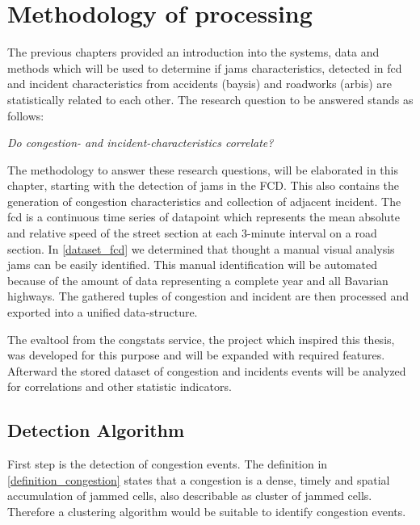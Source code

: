 \chapter{Methodology of processing}
\label{methodology}
The previous chapters provided an introduction into the systems, data and methods which will be used to determine if jams characteristics, detected in \acrshort{fcd} and incident characteristics from accidents (\acrshort{baysis}) and roadworks (\acrshort{arbis}) are statistically related to each other. The research question to be answered stands as follows:

\begin{center}
	\textit{Do congestion- and incident-characteristics correlate?}
\end{center}

\medskip

The methodology to answer these research questions, will be elaborated in this chapter, starting with the detection of jams in the FCD. This also contains the generation of congestion characteristics and collection of adjacent incident. The \acrshort{fcd} is a continuous time series of datapoint which represents the mean absolute and relative speed of the street section at each 3-minute interval on a road section. In \ref{dataset_fcd} we determined that thought a manual visual analysis jams can be easily identified. This manual identification will be automated because of the amount of data representing a complete year and all Bavarian highways. The gathered tuples of congestion and incident are then processed and exported into a unified data-structure. 

The \gls{evaltool} from the \gls{congstats} service, the project which inspired this thesis, was developed for this purpose and will be expanded with required features. Afterward the stored dataset of congestion and incidents events will be analyzed for correlations and other statistic indicators.

\bigskip

\section{Detection Algorithm}
\label{methodology_detection}
First step is the detection of congestion events. The definition in \ref{definition_congestion} states that a congestion is a dense, timely and spatial accumulation of jammed cells, also describable as cluster of jammed cells. Therefore a clustering algorithm would be suitable to identify congestion events.

